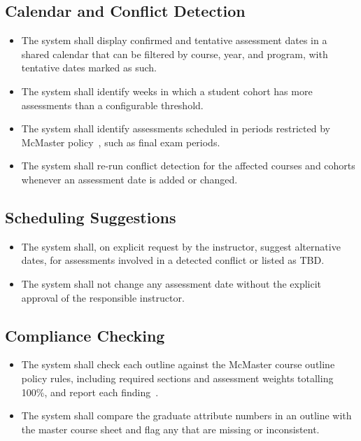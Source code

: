 \documentclass[12pt]{article}
\newcounter{reqnum} %
\begin{document}
\subsection*{Calendar and Conflict Detection}
\begin{itemize}
\item[FR\refstepcounter{reqnum}\thereqnum \label{FR_Calendar}:] The system shall display confirmed and tentative assessment dates in a shared calendar that can be filtered by course, year, and program, with tentative dates marked as such.
\item[FR\refstepcounter{reqnum}\thereqnum \label{FR_Work_Cluster}:] The system shall identify weeks in which a student cohort has more assessments than a configurable threshold.
\item[FR\refstepcounter{reqnum}\thereqnum \label{FR_Work_Policy}:] The system shall identify assessments scheduled in periods restricted by McMaster policy~\citep{McMasterUCMP2025}, such as final exam periods.
\item[FR\refstepcounter{reqnum}\thereqnum \label{FR_Reanalyze}:] The system shall re-run conflict detection for the affected courses and cohorts whenever an assessment date is added or changed.
\end{itemize}

\subsection*{Scheduling Suggestions}
\begin{itemize}
\item[FR\refstepcounter{reqnum}\thereqnum \label{FR_Suggest_Generation}:] The system shall, on explicit request by the instructor, suggest alternative dates, for assessments involved in a detected conflict or listed as TBD.
\item[FR\refstepcounter{reqnum}\thereqnum \label{FR_Suggest_NoAuto}:] The system shall not change any assessment date without the explicit approval of the responsible instructor.
\end{itemize}

\subsection*{Compliance Checking}
\begin{itemize}
\item[FR\refstepcounter{reqnum}\thereqnum \label{FR_Comp_Policy}:] The system shall check each outline against the McMaster course outline policy rules, including required sections and assessment weights totalling 100\%, and report each finding~\citep{McMasterUCMP2025}.
\item[FR\refstepcounter{reqnum}\thereqnum \label{FR_Comp_Grad}:] The system shall compare the graduate attribute numbers in an outline with the master course sheet and flag any that are missing or inconsistent.
\end{itemize}
\end{document}
